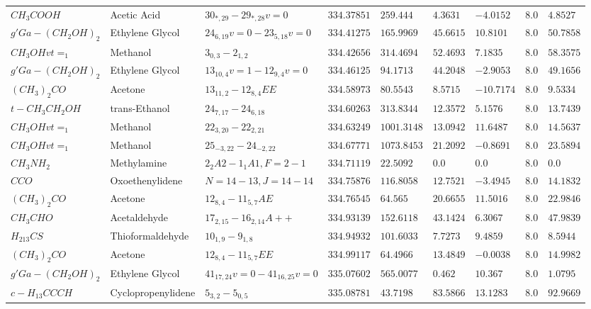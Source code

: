 \documentclass[10pt]{article}
\begin{document}
\begin{table}[htb]
\begin{tabular}{l l l l l l l l l}
$CH_{3}COOH$ & Acetic Acid & $30_{*,29}-29_{*,28}v=0$ & $334.37851$ & $259.444$ & $4.3631$ & $-4.0152$ & $8.0$ & $4.8527$\\
$g'Ga-(CH_{2}OH)_{2}$ & Ethylene Glycol & $24_{6,19}v=0-23_{5,18}v=0$ & $334.41275$ & $165.9969$ & $45.6615$ & $10.8101$ & $8.0$ & $50.7858$\\
$CH_{3}OHvt=_{1}$ & Methanol & $3_{0,3}-2_{1,2}$ & $334.42656$ & $314.4694$ & $52.4693$ & $7.1835$ & $8.0$ & $58.3575$\\
$g'Ga-(CH_{2}OH)_{2}$ & Ethylene Glycol & $13_{10,4}v=1-12_{9,4}v=0$ & $334.46125$ & $94.1713$ & $44.2048$ & $-2.9053$ & $8.0$ & $49.1656$\\
$(CH_{3})_{2}CO$ & Acetone & $13_{11,2}-12_{8,4}EE$ & $334.58973$ & $80.5543$ & $8.5715$ & $-10.7174$ & $8.0$ & $9.5334$\\
$t-CH_{3}CH_{2}OH$ & trans-Ethanol & $24_{7,17}-24_{6,18}$ & $334.60263$ & $313.8344$ & $12.3572$ & $5.1576$ & $8.0$ & $13.7439$\\
$CH_{3}OHvt=_{1}$ & Methanol & $22_{3,20}-22_{2,21}$ & $334.63249$ & $1001.3148$ & $13.0942$ & $11.6487$ & $8.0$ & $14.5637$\\
$CH_{3}OHvt=_{1}$ & Methanol & $25_{-3,22}-24_{-2,22}$ & $334.67771$ & $1073.8453$ & $21.2092$ & $-0.8691$ & $8.0$ & $23.5894$\\
$CH_{3}NH_{2}$ & Methylamine & $2_{2}A2-1_{1}A1,F=2-1$ & $334.71119$ & $22.5092$ & $0.0$ & $0.0$ & $8.0$ & $0.0$\\
$CCO$ & Oxoethenylidene & $N=14-13,J=14-14$ & $334.75876$ & $116.8058$ & $12.7521$ & $-3.4945$ & $8.0$ & $14.1832$\\
$(CH_{3})_{2}CO$ & Acetone & $12_{8,4}-11_{5,7}AE$ & $334.76545$ & $64.565$ & $20.6655$ & $11.5016$ & $8.0$ & $22.9846$\\
$CH_{3}CHO$ & Acetaldehyde & $17_{2,15}-16_{2,14}A++$ & $334.93139$ & $152.6118$ & $43.1424$ & $6.3067$ & $8.0$ & $47.9839$\\
$H_{213}CS$ & Thioformaldehyde & $10_{1,9}-9_{1,8}$ & $334.94932$ & $101.6033$ & $7.7273$ & $9.4859$ & $8.0$ & $8.5944$\\
$(CH_{3})_{2}CO$ & Acetone & $12_{8,4}-11_{5,7}EE$ & $334.99117$ & $64.4966$ & $13.4849$ & $-0.0038$ & $8.0$ & $14.9982$\\
$g'Ga-(CH_{2}OH)_{2}$ & Ethylene Glycol & $41_{17,24}v=0-41_{16,25}v=0$ & $335.07602$ & $565.0077$ & $0.462$ & $10.367$ & $8.0$ & $1.0795$\\
$c-H_{13}CCCH$ & Cyclopropenylidene & $5_{3,2}-5_{0,5}$ & $335.08781$ & $43.7198$ & $83.5866$ & $13.1283$ & $8.0$ & $92.9669$\\

\end{tabular}
\end{table}
\end{document}
